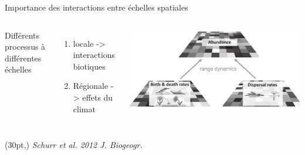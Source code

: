 \documentclass[11pt, compress, aspectratio=1610]{beamer}
\newcommand\smallcitation[1]{%
\begin{textblock*}{\textwidth}(30pt,\textheight)
	\raggedleft \footnotesize\textit{#1}
\end{textblock*}}
\providecommand{\tightlist}{%
  \setlength{\itemsep}{0pt}\setlength{\parskip}{0pt}}
\newcommand{\begincols}{\begin{columns}}
\newcommand{\stopcols}{\end{columns}}
\begin{document}
\begin{frame}{Importance des interactions entre échelles spatiales}

\begincols
{} Différents processus à différentes échelles

\begin{enumerate}
    \def\labelenumi{\arabic{enumi}.}
    \tightlist
    \item
      locale -> interactions biotiques
    \item
      Régionale -> effets du climat
  \end{enumerate}

\hfill{} \centering
 \includegraphics[scale=0.35]{figures/scaleInteg.pdf}\par
\stopcols
\smallcitation{Schurr et al. 2012 J. Biogeogr.}

\end{frame}
\end{document}
